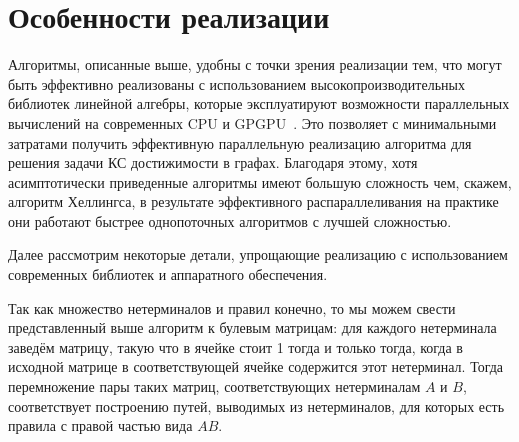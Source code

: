 

\section{Особенности реализации}

Алгоритмы, описанные выше, удобны с точки зрения реализации тем, что могут быть эффективно реализованы с использованием высокопроизводительных библиотек линейной алгебры, которые эксплуатируют возможности параллельных вычислений на современных CPU и  GPGPU~\cite{Mishin:2019:ECP:3327964.3328503}.
Это позволяет с минимальными затратами получить эффективную параллельную реализацию алгоритма для решения задачи КС достижимости в графах.
Благодаря этому, хотя асимптотически приведенные алгоритмы имеют большую сложность чем, скажем, алгоритм Хеллингса, в результате эффективного распараллеливания на практике они работают быстрее однопоточных алгоритмов с лучшей сложностью.

Далее рассмотрим некоторые детали, упрощающие реализацию с использованием современных библиотек и аппаратного обеспечения.

Так как множество нетерминалов и правил конечно, то мы можем свести представленный выше алгоритм к булевым матрицам: для каждого нетерминала заведём матрицу, такую что в ячейке стоит 1 тогда и только тогда, когда в исходной матрице в соответствующей ячейке содержится этот нетерминал.
Тогда перемножение пары таких матриц, соответствующих нетерминалам $A$ и $B$, соответствует построению путей, выводимых из нетерминалов, для которых есть правила с правой частью вида $A B$.

